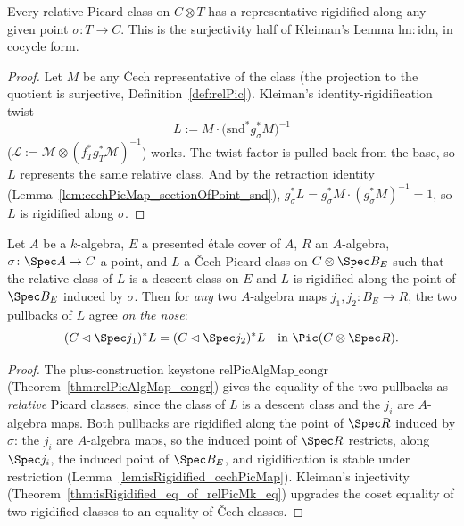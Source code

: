 \begin{theorem}
  \label{thm:relPic_exists_isRigidified_rep}
  \leanok
  Every relative Picard class on \(C \otimes T\) has a representative rigidified along any
  given point \(\sigma \colon T \to C\). This is the surjectivity half of Kleiman's Lemma
  \(\mathrm{lm{:}idn}\), in cocycle form.
\end{theorem}
\begin{proof}
  \leanok
  Let \(M\) be any \v Cech representative of the class (the projection to the quotient is
  surjective, Definition~\ref{def:relPic}). Kleiman's identity-rigidification twist
  \[
    L := M \cdot \bigl(\mathrm{snd}^{*} g_\sigma^{*} M\bigr)^{-1}
  \]
  (\(\mathcal L := \mathcal M \otimes (f_T^{*} g_T^{*} \mathcal M)^{-1}\)) works. The twist factor is pulled
  back from the base, so \(L\) represents the same relative class. And by the retraction
  identity (Lemma~\ref{lem:cechPicMap_sectionOfPoint_snd}),
  \(g_\sigma^{*} L = g_\sigma^{*} M \cdot (g_\sigma^{*} M)^{-1} = 1\), so \(L\) is
  rigidified along \(\sigma\).
\end{proof}

\begin{theorem}
  \label{thm:isRigidified_cechPicMap_congr}
  \leanok
  Let \(A\) be a \(k\)-algebra, \(E\) a presented \'etale cover of \(A\), \(R\) an
  \(A\)-algebra, \(\sigma \colon \Spec A \to C\) a point, and \(L\) a \v Cech Picard class on
  \(C \otimes \Spec B_E\) such that the relative class of \(L\) is a descent class on \(E\)
  and \(L\) is rigidified along the point of \(\Spec B_E\) induced by \(\sigma\). Then for
  \emph{any} two \(A\)-algebra maps \(j_1, j_2 \colon B_E \to R\), the two pullbacks of \(L\)
  agree \emph{on the nose}:
  \[
    (C \lhd \Spec j_1)^{*} L = (C \lhd \Spec j_2)^{*} L \quad\text{in } \Pic(C \otimes \Spec R).
  \]
\end{theorem}
\begin{proof}
  \leanok
  The plus-construction keystone \(\mathrm{relPicAlgMap\_congr}\)
  (Theorem~\ref{thm:relPicAlgMap_congr}) gives the equality of the two pullbacks as
  \emph{relative} Picard classes, since the class of \(L\) is a descent class and the
  \(j_i\) are \(A\)-algebra maps. Both pullbacks are rigidified along the point of
  \(\Spec R\) induced by \(\sigma\): the \(j_i\) are \(A\)-algebra maps, so the induced point
  of \(\Spec R\) restricts, along \(\Spec j_i\), the induced point of \(\Spec B_E\), and
  rigidification is stable under restriction (Lemma~\ref{lem:isRigidified_cechPicMap}).
  Kleiman's injectivity (Theorem~\ref{thm:isRigidified_eq_of_relPicMk_eq}) upgrades the
  coset equality of two rigidified classes to an equality of \v Cech classes.
\end{proof}


